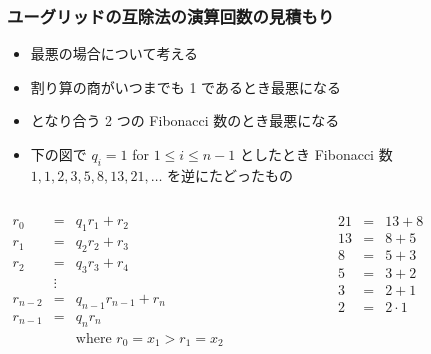 \begin{frame}[fragile]
\frametitle{ユーグリッドの互除法の演算回数の見積もり}
  \begin{itemize}
\item 最悪の場合について考える
\item 割り算の商がいつまでも 1 であるとき最悪になる
\item となり合う 2 つの Fibonacci 数のとき最悪になる
\item 下の図で $q_i=1$ for \(1\le i\le n-1\) としたとき Fibonacci 数 \(1,1,2,3,5,8,13,21,\ldots\) を逆にたどったもの
  \end{itemize}
  \begin{columns}[t]
    \begin{column}{0.45\textwidth}
\centering
      \begin{math}
        \begin{array}{rcl}
r_0 &=& q_1 r_1 + r_2\\
r_1 &=& q_2 r_2 + r_3\\
r_2 &=& q_3 r_3 + r_4\\
&\vdots&\\
r_{n-2} &=& q_{n-1}r_{n-1} + r_{n}\\
r_{n-1} &=& q_{n}r_{n}\\
&&\mbox{where } r_0=x_1>r_1=x_2
        \end{array}
      \end{math}
    \end{column}
    \begin{column}{0.45\textwidth}
\centering
      \begin{math}
        \begin{array}{rcl}
21 &=& 13 + 8\\
13 &=& 8 + 5\\
 8 &=& 5 + 3\\
 5 &=& 3 + 2\\
 3 &=& 2 + 1\\
 2 &=& 2 \cdot 1
        \end{array}
      \end{math}
    \end{column}
  \end{columns}
\end{frame}
\newcommand{\fib}{\mathop{\mathrm{fib}}\nolimits}

